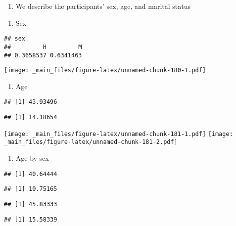 \documentclass[
]{book}
\providecommand{\tightlist}{%
  \setlength{\itemsep}{0pt}\setlength{\parskip}{0pt}}
\begin{document}
\begin{enumerate}
\def\labelenumi{\arabic{enumi}.}
\tightlist
\item
  We describe the participants' sex, age, and marital status
\end{enumerate}

\begin{enumerate}
\def\labelenumi{\alph{enumi}.}
\tightlist
\item
  Sex
\end{enumerate}

\begin{verbatim}
## sex
##         H         M 
## 0.3658537 0.6341463
\end{verbatim}

\texttt{[image: \_main\_files/figure-latex/unnamed-chunk-180-1.pdf]}

\begin{enumerate}
\def\labelenumi{\alph{enumi}.}
\setcounter{enumi}{1}
\tightlist
\item
  Age
\end{enumerate}

\begin{verbatim}
## [1] 43.93496
\end{verbatim}

\begin{verbatim}
## [1] 14.18654
\end{verbatim}

\texttt{[image: \_main\_files/figure-latex/unnamed-chunk-181-1.pdf]} \texttt{[image: \_main\_files/figure-latex/unnamed-chunk-181-2.pdf]}

\begin{enumerate}
\def\labelenumi{\alph{enumi}.}
\setcounter{enumi}{2}
\tightlist
\item
  Age by sex
\end{enumerate}

\begin{verbatim}
## [1] 40.64444
\end{verbatim}

\begin{verbatim}
## [1] 10.75165
\end{verbatim}

\begin{verbatim}
## [1] 45.83333
\end{verbatim}

\begin{verbatim}
## [1] 15.58339
\end{verbatim}
\end{document}
